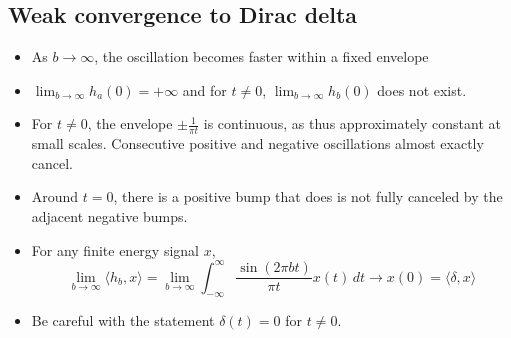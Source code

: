 \documentclass{ximera}
\begin{document}


\subsection{Weak convergence to Dirac delta}
  \begin{itemize}
  \item As $b \to \infty$, the oscillation becomes faster within a fixed envelope
  \item $\lim_{b \to \infty} h_a(0) =+\infty$ and for $t\neq 0$, $\lim_{b \to \infty} h_b(0)$ does not exist.
  \item For $t \neq 0$, the envelope $\pm \frac{1}{\pi t}$ is continuous, as thus approximately constant at small scales. Consecutive positive and negative oscillations almost exactly cancel.
  \item Around $t = 0$, there is a positive bump that does is not fully canceled by the adjacent negative bumps.
  \item For any finite energy signal $x$,
    \[
      \lim_{b \to \infty} \langle h_b, x\rangle = \lim_{b \to \infty} \int_{-\infty}^{\infty} \frac{\sin(2 \pi b t)}{\pi t} x(t)\,dt \to x(0) = \langle\delta,x\rangle
    \]
  \item Be careful with the statement $\delta(t) = 0$ for $t \neq 0$.
  \end{itemize}
\end{document}
